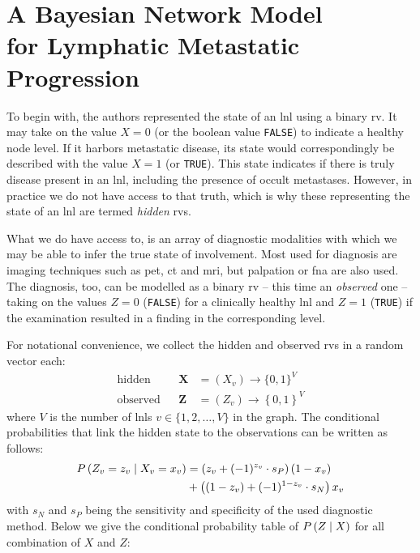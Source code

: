 \documentclass[\relativeRoot/main.tex]{subfiles}
\begin{document}
\section[A Bayesian Network Model for Lymphatic Metastatic Progression]{A Bayesian Network Model\\for Lymphatic Metastatic Progression}
\label{sec:previous_work:bayesian_network}

To begin with, the authors  represented the state of an \gls{lnl} using a binary \gls{rv}. It may take on the value $X=0$ (or the boolean value \texttt{FALSE}) to indicate a healthy node level. If it harbors metastatic disease, its state would correspondingly be described with the value $X=1$ (or \texttt{TRUE}). This state indicates if there is truly disease present in an \gls{lnl}, including the presence of occult metastases. However, in practice we do not have access to that truth, which is why these  representing the state of an \gls{lnl} are termed \emph{hidden} \glspl{rv}.

What we do have access to, is an array of diagnostic modalities with which we may be able to infer the true state of involvement. Most used for diagnosis are imaging techniques such as \gls{pet}, \gls{ct} and \gls{mri}, but palpation or \gls{fna} are also used. The diagnosis, too, can be modelled as a binary \gls{rv} -- this time an \emph{observed} one -- taking on the values $Z=0$ (\texttt{FALSE}) for a clinically healthy \gls{lnl} and $Z=1$ (\texttt{TRUE}) if the examination resulted in a finding in the corresponding level.

For notational convenience, we collect the hidden and observed \glspl{rv} in a random vector each:
%
\begin{equation} \label{eq:bn:variables}
    \begin{aligned}
        \text{hidden}& & \mathbf{X} &= ( X_v ) \rightarrow \{ 0,1 \}^V \\
        \text{observed}& & \mathbf{Z} &= ( Z_v ) \rightarrow \left\{ 0, 1 \right\}^V
    \end{aligned}
\end{equation}
%
where $V$ is the number of \glspl{lnl} $v \in \{ 1,2,\ldots,V \}$ in the graph. The conditional probabilities that link the hidden state to the observations can be written as follows:
%
\begin{equation}
    \begin{aligned}
        P \left( Z_v = z_v \mid X_v = x_v \right) &= \left( z_v + (-1)^{z_v} \cdot s_P \right)(1 - x_v) \\ 
        &+ \left( (1 - z_v) + (-1)^{1 - z_v} \cdot s_N \right) x_v
    \end{aligned}
\end{equation}
%
with $s_N$ and $s_P$ being the sensitivity and specificity of the used diagnostic method. Below we give the conditional probability table of $P \left( Z \mid X \right)$ for all combination of $X$ and $Z$:
\end{document}
